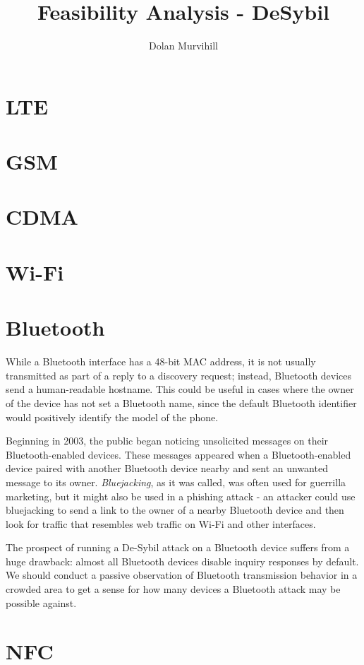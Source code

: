 \documentclass{article}
\title{Feasibility Analysis - DeSybil}
\author{Dolan Murvihill}
\date{}
\begin{document}
\section{LTE}
\section{GSM}
\section{CDMA}
\section{Wi-Fi}
\section{Bluetooth}
While a Bluetooth interface has a 48-bit MAC address, it is not usually
transmitted as part of a reply to a discovery request; instead, Bluetooth
devices send a human-readable hostname. This could be useful in cases where the
owner of the device has not set a Bluetooth name, since the default Bluetooth
identifier would positively identify the model of the phone.

Beginning in 2003, the public began noticing unsolicited messages on their
Bluetooth-enabled devices. These messages appeared when a Bluetooth-enabled
device paired with another Bluetooth device nearby and sent an unwanted message
to its owner. \emph{Bluejacking}, as it was called, was often used for guerrilla
marketing, but it might also be used in a phishing attack - an attacker could
use bluejacking to send a link to the owner of a nearby Bluetooth device and
then look for traffic that resembles web traffic on Wi-Fi and other interfaces.

The prospect of running a De-Sybil attack on a Bluetooth device suffers from a
huge drawback: almost all Bluetooth devices disable inquiry responses by
default. %
We should conduct a passive observation of Bluetooth transmission behavior in a
crowded area to get a sense for how many devices a Bluetooth attack may be
possible against.

\section{NFC}
\end{document}
